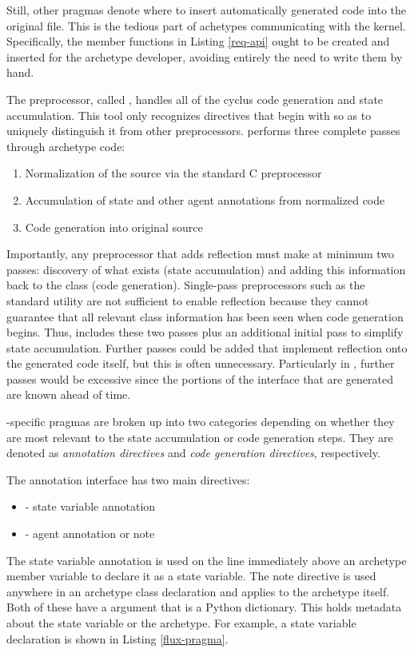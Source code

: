 Still, other pragmas denote where to insert automatically generated code into the
original file. This is the tedious
part of achetypes communicating with the \cyclus kernel. Specifically,
the member functions in Listing \ref{req-api} ought to be created and inserted
for the
archetype developer, avoiding entirely the need to write them by hand.

The \cyclus preprocessor, called \cycpp, handles all of the cyclus code generation
and state accumulation. This tool only recognizes directives that begin with  so as to uniquely distinguish it from other preprocessors.
\cycpp performs three complete passes through archetype code:
\begin{enumerate}
    \item Normalization of the source via the standard C preprocessor 
    \item Accumulation of state and other agent annotations from normalized code
    \item Code generation into original source
\end{enumerate}
Importantly, any preprocessor that adds reflection must make at
minimum two passes: discovery of what exists (state accumulation) and adding this
information back to the class (code generation). Single-pass preprocessors such
as the standard  utility are not sufficient to enable reflection because they
cannot guarantee that all relevant class information has been seen when code generation begins.
Thus, \cycpp includes these two passes plus an additional
initial pass to simplify state accumulation. Further passes could be added that
implement reflection onto the generated code itself, but this is often unnecessary.
Particularly in \cyclus, further passes would be excessive since the portions of the
 interface that are generated are known ahead of time.

\cyclus-specific pragmas are broken up into two categories depending on whether
they are most relevant to the state accumulation or code generation steps. They
are denoted as \emph{annotation directives} and \emph{code generation directives},
respectively.

The \cycpp annotation interface has two main directives:
\begin{itemize}
    \item {} - state variable annotation
    \item {} - agent annotation or note
\end{itemize}
The state variable annotation is used on the line immediately above an archetype
member variable to declare it as a state variable. The note directive is used
anywhere in an archetype class declaration and applies to the archetype itself.
Both of these have a  argument that is a Python dictionary. This
holds metadata about the state variable or the archetype. For example, a 
state variable declaration is shown in Listing \ref{flux-pragma}.

